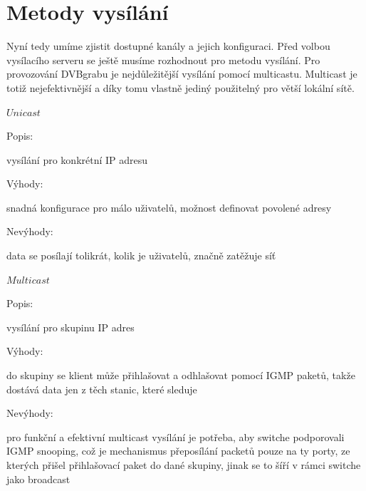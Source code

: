 \section{Metody vysílání}

\vspace{10pt}

Nyní tedy umíme zjistit dostupné kanály a jejich konfiguraci. Před volbou vysílacího serveru se ještě musíme rozhodnout pro metodu vysílání.
Pro provozování DVBgrabu je nejdůležitější vysílání pomocí multicastu. Multicast je totiž nejefektivnější a díky tomu vlastně jediný použitelný pro větší lokální sítě. 

\vspace{10pt}

\begin{bf}$Unicast$\end{bf}


\begin{bf}Popis:\end{bf} vysílání pro konkrétní IP adresu


\begin{bf}Výhody:\end{bf} snadná konfigurace pro málo uživatelů, možnost definovat povolené adresy


\begin{bf}Nevýhody:\end{bf} data se posílají tolikrát, kolik je uživatelů, značně zatěžuje síť

\vspace{10pt}

\begin{bf}$Multicast$\end{bf}


\begin{bf}Popis:\end{bf} vysílání pro skupinu IP adres


\begin{bf}Výhody:\end{bf} do skupiny se klient může přihlašovat a odhlašovat pomocí IGMP paketů, takže dostává data jen z těch stanic, které sleduje


\begin{bf}Nevýhody:\end{bf} pro funkční a efektivní multicast vysílání je potřeba, aby switche podporovali IGMP snooping, což je mechanismus přeposílání packetů pouze na ty porty, ze kterých přišel přihlašovací paket do dané skupiny, jinak se to šíří v rámci switche jako broadcast

